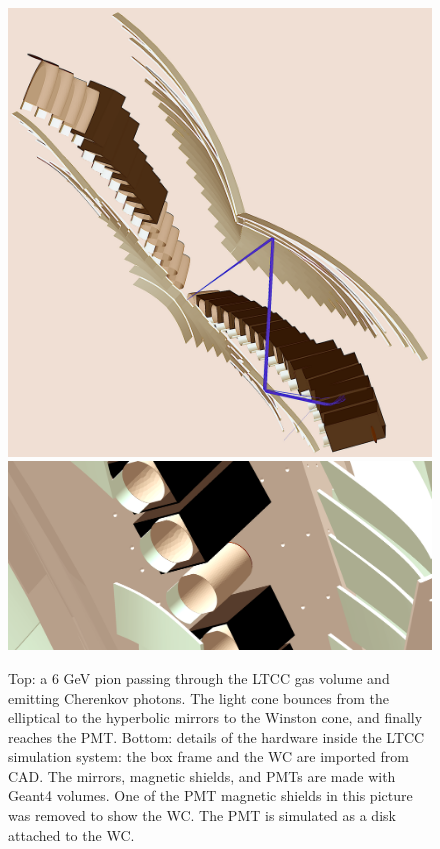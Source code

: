 \begin{figure}
	\centering
	\includegraphics[width=0.99\columnwidth, keepaspectratio]{img/ltccGeometry.png}
	\includegraphics[width=0.99\columnwidth, keepaspectratio]{img/ltccDetail.png}
	\caption{Top: a 6 GeV pion passing through the LTCC gas volume and emitting Cherenkov photons. The light cone
            bounces from the elliptical to the hyperbolic mirrors to the Winston cone, and finally reaches the PMT.
            Bottom: details of the hardware inside the LTCC simulation system: the box frame and the WC are
            imported from CAD. The mirrors, magnetic shields, and PMTs are made with Geant4 volumes.
            One of the PMT magnetic shields
            in this picture was removed to show the WC. The PMT is simulated as a disk attached to the WC. }
	\label{fig:ltccGeometry}
\end{figure}

